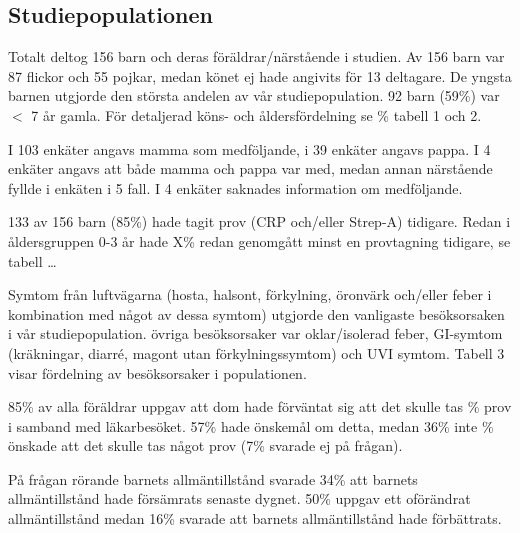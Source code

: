 \documentclass{nature}
\begin{document}
\subsection{Studiepopulationen}
Totalt deltog 156 barn och deras f\"or\"aldrar/n\"arst\r{a}ende i studien. Av 156 barn var
87 flickor och 55 pojkar, medan k\"onet ej hade angivits f\"or 13 deltagare. De
yngsta barnen utgjorde den st\"orsta andelen av v\r{a}r studiepopulation. 92 barn
(59\%) var $<$ 7 \r{a}r gamla. F\"or detaljerad k\"ons- och
\r{a}ldersf\"ordelning se \% tabell 1
och 2.

I 103 enk\"ater angavs mamma som medf\"oljande, i 39 enk\"ater angavs pappa. I 4
enk\"ater angavs att b\r{a}de mamma och pappa var med, medan annan n\"arst\r{a}ende fyllde i
enk\"aten i 5 fall. I 4 enk\"ater  saknades information om medf\"oljande.

133 av 156 barn (85\%) hade tagit prov (CRP och/eller Strep-A) tidigare. Redan i
\r{a}ldersgruppen 0-3 \r{a}r hade X\% redan genomg\r{a}tt minst en provtagning
tidigare, se
tabell …

Symtom fr\r{a}n luftv\"agarna (hosta, halsont, f\"orkylning, \"oronv\"ark och/eller feber i
kombination med n\r{a}got av dessa symtom) utgjorde den vanligaste bes\"oksorsaken i
v\r{a}r studiepopulation. \"ovriga bes\"oksorsaker var oklar/isolerad feber, GI-symtom
(kr\"akningar, diarré, magont utan f\"orkylningssymtom) och UVI symtom. Tabell 3
visar f\"ordelning av bes\"oksorsaker i populationen.

85\% av alla f\"or\"aldrar uppgav att dom hade f\"orv\"antat sig att det skulle tas
\% prov
i samband med l\"akarbes\"oket. 57\% hade \"onskem\r{a}l om detta, medan 36\% inte
\% \"onskade
att det skulle tas n\r{a}got prov (7\% svarade ej p\r{a} fr\r{a}gan).

P\r{a} fr\r{a}gan r\"orande barnets allm\"antillst\r{a}nd svarade 34\% att barnets
allm\"antillst\r{a}nd hade f\"ors\"amrats senaste dygnet. 50\% uppgav ett
of\"or\"andrat
allm\"antillst\r{a}nd medan 16\% svarade att barnets allm\"antillst\r{a}nd hade
f\"orb\"attrats.
\end{document}
